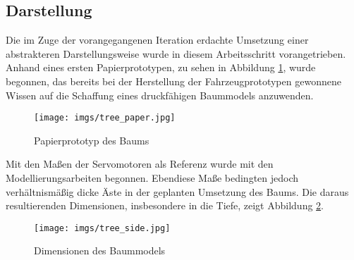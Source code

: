 \documentclass[.../Dokumentation.tex]{subfiles}
\begin{document}
\subsection{Darstellung}\label{sec-ita2-visualization}
Die im Zuge der vorangegangenen Iteration erdachte Umsetzung einer abstrakteren 
Darstellungsweise wurde in diesem Arbeitsschritt vorangetrieben. 
Anhand eines ersten Papierprototypen, zu sehen in Abbildung 
\ref{fig-tree-paper}, wurde begonnen, das bereits bei der Herstellung der 
Fahrzeugprototypen gewonnene Wissen auf die Schaffung eines druckfähigen 
Baummodels anzuwenden.
\begin{figure}[H]
\begin{center}
    \texttt{[image: imgs/tree\_paper.jpg]}
    \caption{Papierprototyp des Baums}
    \label{fig-tree-paper}
\end{center}
\end{figure}
\noindent
Mit den Maßen der Servomotoren als Referenz wurde mit den Modellierungsarbeiten 
begonnen. Ebendiese Maße bedingten jedoch verhältnismäßig dicke Äste in der 
geplanten Umsetzung des Baums. 
Die daraus resultierenden Dimensionen, insbesondere in die Tiefe, zeigt 
Abbildung \ref{fig-tree-side}.
\begin{figure}[H]
\begin{center}
    \texttt{[image: imgs/tree\_side.jpg]}
    \caption{Dimensionen des Baummodels}
    \label{fig-tree-side}
\end{center}
\end{figure}
\end{document}
